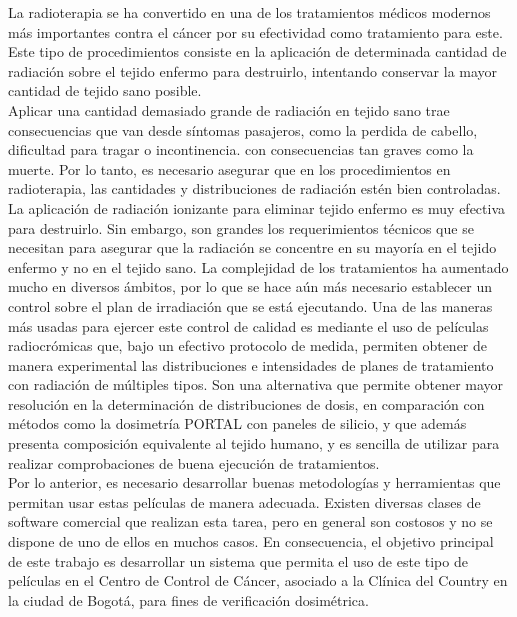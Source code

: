 La radioterapia se ha convertido en una de los tratamientos médicos modernos más importantes contra el cáncer por su efectividad como tratamiento para este. Este tipo de procedimientos consiste en la aplicación de determinada cantidad de radiación sobre el tejido enfermo para destruirlo, intentando conservar la mayor cantidad de tejido sano posible.\\

Aplicar una cantidad demasiado grande de radiación en tejido sano trae consecuencias que van desde síntomas pasajeros, como la perdida de cabello, dificultad para tragar o incontinencia. con consecuencias tan graves como la muerte\cite{cancer.net_2020}.  Por lo tanto, es necesario asegurar que en los procedimientos en radioterapia, las cantidades y distribuciones de radiación estén bien controladas.\\

La aplicación de radiación ionizante para eliminar tejido enfermo es muy efectiva para destruirlo. Sin embargo, son grandes los requerimientos técnicos que se necesitan para asegurar que la radiación se concentre en su mayoría en el tejido enfermo y no en el tejido sano. La complejidad de los tratamientos ha aumentado mucho en diversos ámbitos, por lo que se hace aún más necesario establecer un control sobre el plan de irradiación que se está ejecutando. Una de las maneras más usadas para ejercer este control de calidad es mediante el uso de películas radiocrómicas que, bajo un efectivo protocolo de medida, permiten obtener de manera experimental las distribuciones e intensidades de planes de tratamiento con radiación de múltiples tipos. Son una alternativa que permite obtener mayor resolución en la determinación de distribuciones de dosis, en comparación con métodos como la dosimetría PORTAL con paneles de silicio, y que además presenta composición equivalente al tejido humano, y es sencilla de utilizar para realizar comprobaciones de buena ejecución de tratamientos. \\

Por lo anterior, es necesario desarrollar buenas metodologías y herramientas que permitan usar estas películas de manera adecuada. Existen diversas clases de software comercial que realizan esta tarea, pero en general son costosos y no se dispone de uno de ellos en muchos casos. En consecuencia, el objetivo principal de este trabajo es desarrollar un sistema que permita el uso de este tipo de películas en el Centro de Control de Cáncer, asociado a la Clínica del Country en la ciudad de Bogotá, para fines de verificación dosimétrica. 